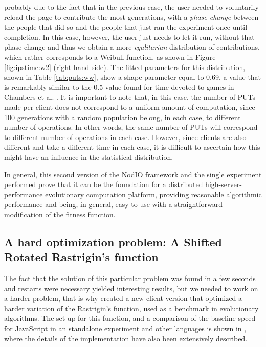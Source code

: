 \documentclass{sig-alternate}
\begin{document}
probably due to the fact that in the previous case, the user needed to
voluntarily reload the page to contribute the most generations, with a
{\em phase change} between the people that did so and the people that
just ran the experiment once until completion. In this case, however, the
user just needs to let it run, without that phase change and thus we obtain a
more {\em egalitarian} distribution of contributions, which rather
corresponds to a Weibull function, as shown in Figure
\ref{fig:ipstime:w2} (right hand side). The fitted parameters for this
distribution, shown in Table \ref{tab:puts:ww}, show a shape parameter
equal to 0.69, a value that is remarkably similar to the 0.5 value
found for time devoted to games in Chambers et
al. \cite{chambers2005measurement}. It is important to note that, in
this case, the number of PUTs made per client does not correspond to a
uniform amount of computation, since 100 generations with a random
population belong, in each case, to different number of
operations. In other words, the same number of PUTs will correspond to
different number of operations in each case. However, since clients
are also different and take a different time in each case, it is
difficult to ascertain how this might have an influence in the
statistical distribution.

In general, this second version of the {\sf NodIO} framework and the
single experiment performed prove that it can be the foundation for a distributed
high-server-performance evolutionary computation platform,
providing reasonable algorithmic performance and being, in general,
easy to use with a straightforward modification of the fitness
function. 

\subsection{A hard optimization problem: A Shifted Rotated Rastrigin's function}
\label{sec:rastrigin}

The fact that the solution of this particular problem was found in a
few seconds and restarts were necessary yielded interesting results,
but we needed to work on a harder problem, that is why created a new
client version that optimized a harder variation of the Rastrigin's function, 
used as a benchmark in evolutionary
algorithms. The set up for this function, and a comparison of the
baseline speed for JavaScript in an standalone experiment and other
languages is shown in \cite{2016arXiv160101607Manom}, where the details of
the implementation have also been extensively described. 
\end{document}
